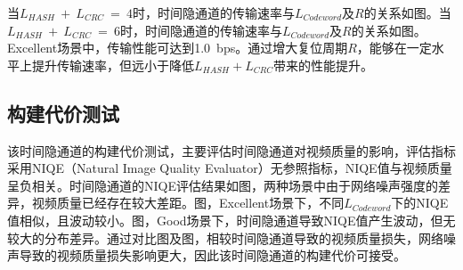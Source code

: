 当$L_{HASH}\ +\ L_{CRC}\ =\ 4$时，时间隐通道的传输速率与$L_{Codeword}$及$R$的关系如图。当$L_{HASH}\ +\ L_{CRC}\ =\ 6$时，时间隐通道的传输速率与$L_{Codeword}$及$R$的关系如图。Excellent场景中，传输性能可达到{1.0\ bps}。通过增大复位周期$R$，能够在一定水平上提升传输速率，但远小于降低$L_{HASH}+L_{CRC}$带来的性能提升。

\subsection{构建代价测试}
\label{chap:hash:result:cost}


该时间隐通道的构建代价测试，主要评估时间隐通道对视频质量的影响，评估指标采用NIQE（Natural Image Quality Evaluator）无参照指标，NIQE值与视频质量呈负相关。时间隐通道的NIQE评估结果如图，两种场景中由于网络噪声强度的差异，视频质量已经存在较大差距。图，Excellent场景下，不同$L_{Codeword}$下的NIQE值相似，且波动较小。图，Good场景下，时间隐通道导致NIQE值产生波动，但无较大的分布差异。通过对比图及图，相较时间隐通道导致的视频质量损失，网络噪声导致的视频质量损失影响更大，因此该时间隐通道的构建代价可接受。

